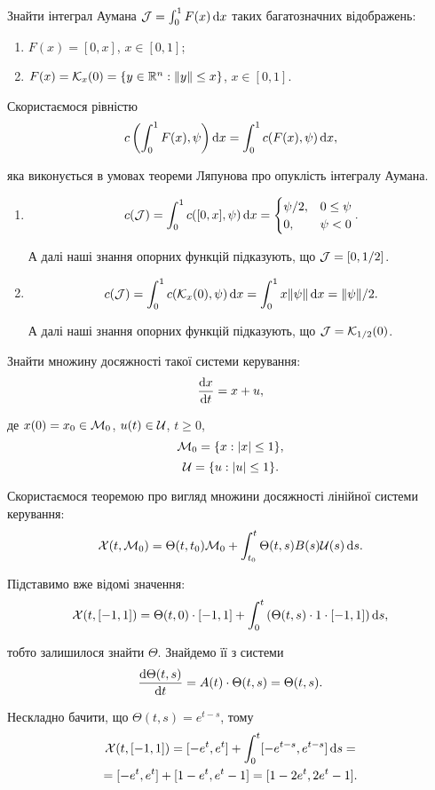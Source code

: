 \begin{problem}
	Знайти інтеграл Аумана $\mathcal{J} = \int_0^1 F(x) \mathop{}\!\mathrm{d} x$ таких багатозначних відображень:

	\begin{enumerate}
		\item $F(x) = [0, x]$, $x \in [0, 1]$;

		\item $F(x) = \mathcal{K}_x (0) = \{ y \in \mathbb{R}^n: \|y\| \le x \}$, $x \in [0, 1]$.
	\end{enumerate}
\end{problem}

\begin{solution}
	Скористаємося рівністю \[ c \left(\int_0^1 F(x), \psi\right) \mathop{}\!\mathrm{d} x = \int_0^1 c(F(x), \psi) \mathop{}\!\mathrm{d} x, \]

	яка виконується в умовах теореми Ляпунова про опуклість інтегралу Аумана.

	\begin{enumerate}
		\item \[c(\mathcal{J}) = \int_0^1 c([0, x], \psi) \mathop{}\!\mathrm{d} x = \begin{cases} \psi / 2, & 0 \le \psi \\ 0, & \psi < 0 \end{cases}. \]

		А далі наші знання опорних функцій підказують, що $\mathcal{J} = [0, 1 / 2]$.

		\item \[c(\mathcal{J}) = \int_0^1 c(\mathcal{K}_x(0), \psi) \mathop{}\!\mathrm{d} x = \int_0^1 x \| \psi \| \mathop{}\!\mathrm{d} x = \| \psi \| / 2. \]

		А далі наші знання опорних функцій підказують, що $\mathcal{J} = \mathcal{K}_{1 / 2} (0)$.
	\end{enumerate}
\end{solution}

\begin{problem}
	Знайти множину досяжності такої системи керування: \[ \frac{\mathop{}\!\mathrm{d} x}{\mathop{}\!\mathrm{d} t} = x + u, \]

	де $x (0) = x_0 \in \mathcal{M}_0$, $u (t) \in \mathcal{U}$, $t \ge 0$, \[ \mathcal{M}_0 = \{ x: |x| \le 1 \}, \] \[ \mathcal{U} = \{ u: |u| \le 1 \}. \]
\end{problem}

\begin{solution}
	Скористаємося теоремою про вигляд множини досяжності лінійної системи керування: \[ \mathcal{X}(t, \mathcal{M}_0) = \Theta(t, t_0) \mathcal{M}_0 + \int_{t_0}^t \Theta(t, s) B(s) \mathcal{U}(s) \mathop{}\!\mathrm{d} s. \]

	Підставимо вже відомі значення: \[ \mathcal{X}(t, [-1, 1]) = \Theta(t, 0) \cdot [-1, 1] + \int_0^t \left( \Theta(t, s) \cdot 1 \cdot [-1, 1] \right) \mathop{}\!\mathrm{d} s, \] 

	тобто залишилося знайти $\Theta$. Знайдемо її з системи \[ \frac{\mathop{}\!\mathrm{d} \Theta(t, s)}{\mathop{}\!\mathrm{d} t} = A(t) \cdot \Theta(t, s) = \Theta(t, s). \]

	Нескладно бачити, що $\Theta(t, s) = e^{t - s}$, тому \begin{multline*} \mathcal{X}(t, [-1, 1]) = [-e^t, e^t] + \int_0^t [-e^{t - s}, e^{t - s}] \mathop{}\!\mathrm{d} s = \\ = [-e^t, e^t] + [1 - e^t, e^t - 1] = [1 - 2 e^t, 2 e^t - 1]. \end{multline*} 
\end{solution}

